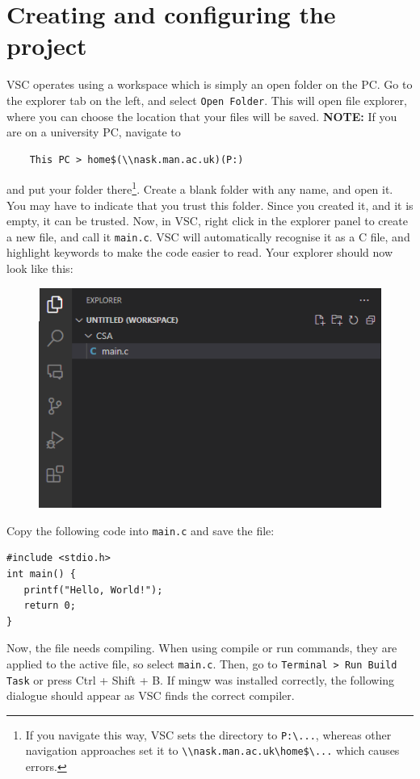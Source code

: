 \documentclass{article}
\begin{document}
\section{Creating and configuring the project}\label{Section_3}

VSC operates using a workspace which is simply an open folder on the PC. Go to the explorer tab on the left, and select \verb|Open Folder|. This will open file explorer, where you can choose the location that your files will be saved. \textbf{NOTE: } If you are on a university PC, navigate to \begin{verbatim}
    This PC > home$(\\nask.man.ac.uk)(P:)
\end{verbatim}and put your folder there\footnote{If you navigate this way, VSC sets the directory to \verb|P:\...|, whereas other navigation approaches set it to \verb|\\nask.man.ac.uk\home$\...| which causes errors.}. Create a blank folder with any name, and open it. You may have to indicate that you trust this folder. Since you created it, and it is empty, it can be trusted. Now, in VSC, right click in the explorer panel to create a new file, and call it \texttt{main.c}. VSC will automatically recognise it as a C file, and highlight keywords to make the code easier to read. Your explorer should now look like this:
\begin{figure}[H]
    \centering
    \includegraphics[width=0.5\linewidth]{explorer.png}
    \label{fig:enter-label}
\end{figure}

Copy the following code into \texttt{main.c} and save the file:

\begin{verbatim}
#include <stdio.h> 
int main() {
   printf("Hello, World!");
   return 0;
}
\end{verbatim}

Now, the file needs compiling. When using compile or run commands, they are applied to the active file, so select \verb|main.c|. Then, go to \verb|Terminal > Run Build Task| or press Ctrl + Shift + B. If mingw was installed correctly, the following dialogue should appear as VSC finds the correct compiler.
\end{document}
